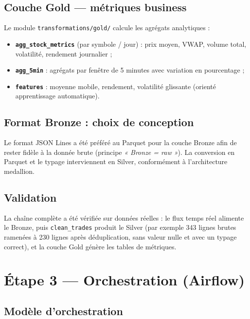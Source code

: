 \documentclass[11pt,a4paper]{article}
\newcommand{\code}[1]{\texttt{\small #1}}
\begin{document}
\subsection{Couche Gold — métriques business}

Le module \code{transformations/gold/} calcule les agrégats analytiques :
\begin{itemize}
  \item \textbf{\code{agg\_stock\_metrics}} (par symbole / jour) :
        prix moyen, VWAP, volume total, volatilité, rendement journalier ;
  \item \textbf{\code{agg\_5min}} : agrégats par fenêtre de 5 minutes avec
        variation en pourcentage ;
  \item \textbf{\code{features}} : moyenne mobile, rendement, volatilité
        glissante (orienté apprentissage automatique).
\end{itemize}

\subsection{Format Bronze : choix de conception}

Le format JSON Lines a été préféré au Parquet pour la couche Bronze afin de
rester fidèle à la donnée brute (principe \emph{« Bronze = raw »}). La
conversion en Parquet et le typage interviennent en Silver, conformément à
l'architecture medallion.

\subsection{Validation}

La chaîne complète a été vérifiée sur données réelles : le flux temps réel
alimente le Bronze, puis \code{clean\_trades} produit le Silver (par exemple
343 lignes brutes ramenées à 230 lignes après déduplication, sans valeur nulle
et avec un typage correct), et la couche Gold génère les tables de métriques.

\section{Étape 3 — Orchestration (Airflow)}

\subsection{Modèle d'orchestration}
\end{document}
